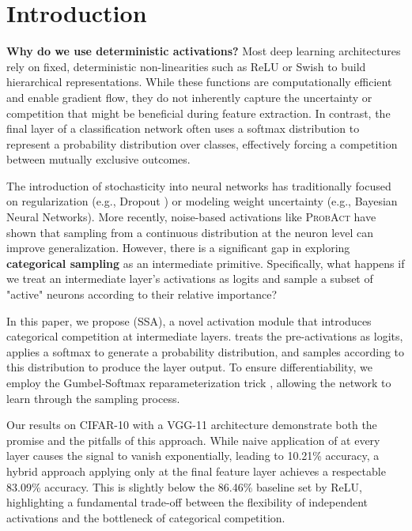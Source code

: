 \section{Introduction}

{\bf Why do we use deterministic activations?} Most deep learning architectures rely on fixed, deterministic non-linearities such as ReLU or Swish to build hierarchical representations. While these functions are computationally efficient and enable gradient flow, they do not inherently capture the uncertainty or competition that might be beneficial during feature extraction. In contrast, the final layer of a classification network often uses a softmax distribution to represent a probability distribution over classes, effectively forcing a competition between mutually exclusive outcomes.

The introduction of stochasticity into neural networks has traditionally focused on regularization (e.g., Dropout \cite{dropout2014}) or modeling weight uncertainty (e.g., Bayesian Neural Networks). More recently, noise-based activations like \textsc{ProbAct} \cite{probact2019} have shown that sampling from a continuous distribution at the neuron level can improve generalization. However, there is a significant gap in exploring {\bf categorical sampling} as an intermediate primitive. Specifically, what happens if we treat an intermediate layer's activations as logits and sample a subset of "active" neurons according to their relative importance?

In this paper, we propose \methodname (\textsc{SSA}), a novel activation module that introduces categorical competition at intermediate layers. \methodname treats the pre-activations as logits, applies a softmax to generate a probability distribution, and samples according to this distribution to produce the layer output. To ensure differentiability, we employ the Gumbel-Softmax reparameterization trick \cite{gumbel1998}, allowing the network to learn through the sampling process.

Our results on CIFAR-10 with a VGG-11 architecture demonstrate both the promise and the pitfalls of this approach. While naive application of \methodname at every layer causes the signal to vanish exponentially, leading to 10.21\% accuracy, a hybrid approach applying \methodname only at the final feature layer achieves a respectable 83.09\% accuracy. This is slightly below the 86.46\% baseline set by ReLU, highlighting a fundamental trade-off between the flexibility of independent activations and the bottleneck of categorical competition.

